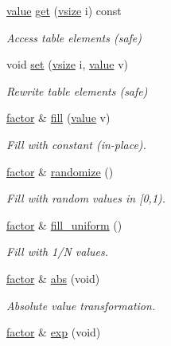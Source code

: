 \begin{DoxyCompactItemize}
\hyperlink{classmerlin_1_1factor_a1b14d19e509403448fbef26b003c9281}{value} \hyperlink{classmerlin_1_1factor_a00577a040e7cc14960d2dccdde51d8fc}{get} (\hyperlink{classmerlin_1_1factor_a31de8d8d0c43cc33dc3874408e75b0fc}{vsize} i) const 
\begin{DoxyCompactList}\small\item\em Access table elements (safe) \end{DoxyCompactList}\item 
void \hyperlink{classmerlin_1_1factor_a4d2cca33f1690c4ae6da5ae619eb85f6}{set} (\hyperlink{classmerlin_1_1factor_a31de8d8d0c43cc33dc3874408e75b0fc}{vsize} i, \hyperlink{classmerlin_1_1factor_a1b14d19e509403448fbef26b003c9281}{value} v)
\begin{DoxyCompactList}\small\item\em Rewrite table elements (safe) \end{DoxyCompactList}\item 
\hyperlink{classmerlin_1_1factor}{factor} \& \hyperlink{classmerlin_1_1factor_afaa0fdcd03f249eb95d0d2d1a0fa4801}{fill} (\hyperlink{classmerlin_1_1factor_a1b14d19e509403448fbef26b003c9281}{value} v)
\begin{DoxyCompactList}\small\item\em Fill with constant (in-\/place). \end{DoxyCompactList}\item 
\hyperlink{classmerlin_1_1factor}{factor} \& \hyperlink{classmerlin_1_1factor_ae9a389d41073f212805020536805fd9c}{randomize} ()
\begin{DoxyCompactList}\small\item\em Fill with random values in \mbox{[}0,1). \end{DoxyCompactList}\item 
\hyperlink{classmerlin_1_1factor}{factor} \& \hyperlink{classmerlin_1_1factor_aad8b981d1b94cd12e289292fa5a7b545}{fill\+\_\+uniform} ()
\begin{DoxyCompactList}\small\item\em Fill with 1/\+N values. \end{DoxyCompactList}\item 
\hyperlink{classmerlin_1_1factor}{factor} \& \hyperlink{classmerlin_1_1factor_a7f17cb3f6c27f2cb5a74f8469ba4304e}{abs} (void)
\begin{DoxyCompactList}\small\item\em Absolute value transformation. \end{DoxyCompactList}\item 
\hyperlink{classmerlin_1_1factor}{factor} \& \hyperlink{classmerlin_1_1factor_accb7e85361551760b87156becbd5b9d1}{exp} (void)

\end{DoxyCompactItemize}
